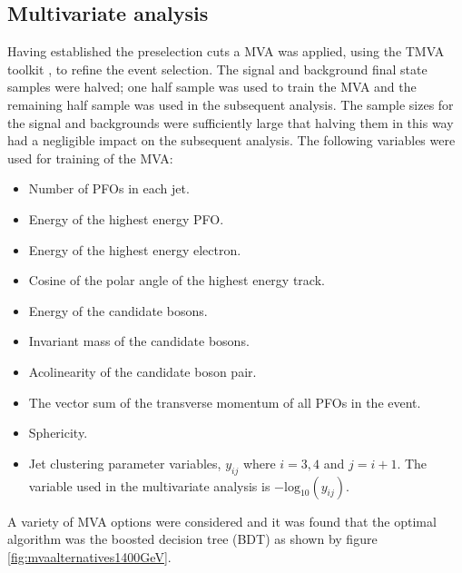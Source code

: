
\subsection{Multivariate analysis}
\label{sec:mva1400GeV}
Having established the preselection cuts a MVA was applied, using the TMVA toolkit \cite{Hocker:2007ht}, to refine the event selection.  The signal and background final state samples were halved; one half sample was used to train the MVA and the remaining half sample was used in the subsequent analysis.  The sample sizes for the signal and backgrounds were sufficiently large that halving them in this way had a negligible impact on the subsequent analysis.  The following variables were used for training of the MVA:
\begin{itemize}
\item Number of PFOs in each jet. 
\item Energy of the highest energy PFO.
\item Energy of the highest energy electron.
\item Cosine of the polar angle of the highest energy track.
\item Energy of the candidate bosons.
\item Invariant mass of the candidate bosons.
\item Acolinearity of the candidate boson pair.
\item The vector sum of the transverse momentum of all PFOs in the event. 
\item Sphericity. 
\item Jet clustering parameter variables, $y_{ij}$ where $i = 3,4$ and $j=i+1$.  The variable used in the multivariate analysis is $-\text{log}_{10}(y_{ij})$.
\end{itemize}

A variety of MVA options were considered and it was found that the optimal algorithm was the boosted decision tree (BDT) as shown by figure \ref{fig:mvaalternatives1400GeV}.  

